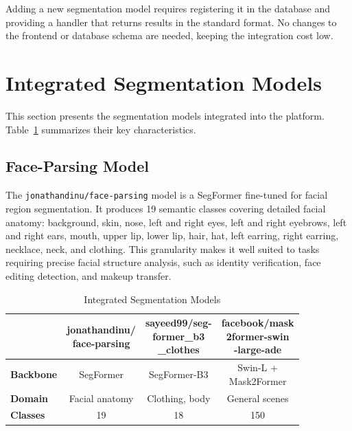 \documentclass[conference,a4paper,flushend]{iaria}
\begin{document}
Adding a new segmentation model requires registering it in the database and providing a handler that returns results in the standard format. No changes to the frontend or database schema are needed, keeping the integration cost low.

\section{Integrated Segmentation Models}
\label{sec:models}

This section presents the segmentation models integrated into the platform. Table~\ref{tab:models} summarizes their key characteristics.

\subsection{Face-Parsing Model}

The \texttt{jonathandinu/face-parsing} \cite{jonathandinu2023faceparsing} model is a SegFormer \cite{xie2021segformersimpleefficientdesign} fine-tuned for facial region segmentation. It produces 19 semantic classes covering detailed facial anatomy: background, skin, nose, left and right eyes, left and right eyebrows, left and right ears, mouth, upper lip, lower lip, hair, hat, left earring, right earring, necklace, neck, and clothing. This granularity makes it well suited to tasks requiring precise facial structure analysis, such as identity verification, face editing detection, and makeup transfer.

\begin{table}[htbp]
\caption{Integrated Segmentation Models}
\label{tab:models}
{\small\setlength{\tabcolsep}{4pt}\setcellgapes{4pt}\makegapedcells
\begin{tabular}{| l | c | c | c |}
\hline
 & \makecell[l]{\textbf{jonathandinu/}\\\textbf{face-parsing} \cite{jonathandinu2023faceparsing}}
 & \makecell[l]{\textbf{sayeed99/seg-}\\\textbf{former\_b3}\\\textbf{\_clothes} \cite{afridi2023segformerb3}}
 & \makecell[l]{\textbf{facebook/mask}\\\textbf{2former-swin}\\\textbf{-large-ade} \cite{cheng2022maskedattentionmasktransformeruniversal}} \\
\hline
\textbf{Backbone} & SegFormer & SegFormer-B3 & \makecell[c]{Swin-L +\\Mask2Former} \\
\hline
\textbf{Domain}   & Facial anatomy & Clothing, body & General scenes \\
\hline
\textbf{Classes}  & 19        & 18           & 150 \\
\hline
\end{tabular}
}
\end{table}
\end{document}
